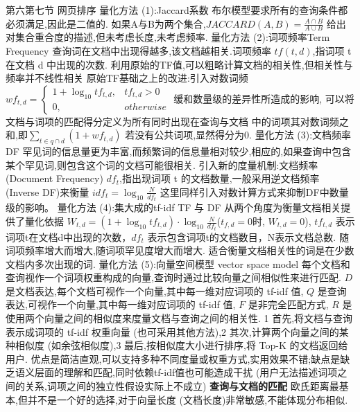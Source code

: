 \documentclass[10pt, utf8]{ctexart}
\begin{document}
\begin{multicols}{4}
    {\color{orange_}第六第七节 网页排序}
    {\color{red}量化方法 (1):Jaccard系数}
    布尔模型要求所有的查询条件都必须满足,因此是二值的.
    如果A与B为两个集合,$JACCARD(A, B)=\frac{A\cap B}{A\cup B}$
    给出对集合重合度的描述,但未考虑长度,未考虑频率.
    {\color{red}量化方法 (2):词项频率Term Frequency}
    查询词在文档中出现得越多,该文档越相关.词项频率 $tf(t,d)$,指词项 t 在文档 d 中出现的次数.
    利用原始的TF值,可以粗略计算文档的相关性,但相关性与频率并不线性相关
    原始TF基础之上的改进:引入对数词频
    $wf_{t, d}= \begin{cases}
            1+\log_{10} tf_{t, d}, & tf_{t, d}> 0 \\
            0,                     & otherwise
        \end{cases}       $
    缓和数量级的差异性所造成的影响,
    可以将文档与词项的匹配得分定义为所有同时出现在查询与文档
    中的词项其对数词频之和,即$\sum_{t\in q\cap d}(1+wf_{t, d})$
    若没有公共词项,显然得分为0.
    {\color{red}量化方法 (3):文档频率DF}
    罕见词的信息量更为丰富,而频繁词的信息量相对较少,相应的,如果查询中包含某个罕见词,则包含这个词的文档可能很相关.
    引入新的度量机制:文档频率 (Document Frequency)
    $df_t$,指出现词项 t 的文档数量,一般采用逆文档频率 (Inverse DF)来衡量
    $idf_t=\log_{10}\frac{N}{df_t} $
    这里同样引入对数计算方式来抑制DF中数量级的影响。
    {\color{red}量化方法 (4):集大成的tf-idf}
    TF 与 DF 从两个角度为衡量文档相关提供了量化依据
    {\tiny$W_{t, d}=(1+\log_{10} tf_{t, d}) \cdot \log_{10} \frac{N}{d f_{t}}$}($t_{f,d} = 0$时, $W_{t, d} = 0$),
    $tf_{t,d}$ 表示词项t在文档d中出现的次数，$df_t$ 表示包含词项t的文档数目，N表示文档总数.
    随词项频率增大而增大,随词项罕见度增大而增大.
    适合衡量文档相关性的词是在少数文档内多次出现的词.
    {\color{red}量化方法 (5):向量空间模型 vector space model}
    每个文档和查询视作一个词项权重构成的向量,查询时通过比较向量之间相似性来进行匹配.
    $D$ 是文档表达,每个文档可视作一个向量,其中每一维对应词项的 tf-idf 值,
    $Q$ 是查询表达,可视作一个向量,其中每一维对应词项的 tf-idf 值,
    $F$ 是非完全匹配方式, $R$ 是使用两个向量之间的相似度来度量文档与查询之间的相关性.
    1 首先,将文档与查询表示成词项的 tf-idf 权重向量 (也可采用其他方法),2 其次,计算两个向量之间的某种相似度 (如余弦相似度),3 最后,按相似度大小进行排序,将 Top-K 的文档返回给用户.
    优点是简洁直观,可以支持多种不同度量或权重方式,实用效果不错;缺点是缺乏语义层面的理解和匹配,同时依赖tf-idf值也可能造成干扰 (用户无法描述词项之间的关系,词项之间的独立性假设实际上不成立)
    {\color{purple_}\textbf{查询与文档的匹配}}
    欧氏距离最基本,但并不是一个好的选择,对于向量长度 (文档长度)非常敏感,不能体现分布相似.

\end{multicols}
\end{document}
